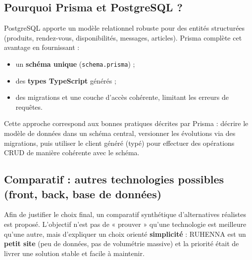 \subsection{Pourquoi Prisma et PostgreSQL ?}
PostgreSQL apporte un modèle relationnel robuste pour des entités structurées (produits, rendez-vous, disponibilités, messages, articles). Prisma complète cet avantage en fournissant :
\begin{itemize}
    \item un \textbf{schéma unique} (\texttt{schema.prisma}) ;
    \item des \textbf{types TypeScript} générés ;
    \item des migrations et une couche d’accès cohérente, limitant les erreurs de requêtes.
\end{itemize}
Cette approche correspond aux bonnes pratiques décrites par Prisma \cite{prismaDocs} : décrire le modèle de données dans un schéma central, versionner les évolutions via des migrations, puis utiliser le client généré (typé) pour effectuer des opérations CRUD de manière cohérente avec le schéma.

\subsection{Comparatif : autres technologies possibles (front, back, base de données)}
Afin de justifier le choix final, un comparatif synthétique d’alternatives réalistes est proposé. L’objectif n’est pas de « prouver » qu’une technologie est meilleure qu’une autre, mais d’expliquer un choix orienté \textbf{simplicité} : RUHENNA est un \textbf{petit site} (peu de données, pas de volumétrie massive) et la priorité était de livrer une solution stable et facile à maintenir.

